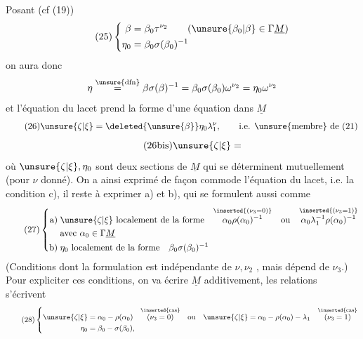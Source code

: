 Posant (cf (19))
\[
\tag{25}
\left\{\begin{aligned}
\beta&=\beta_0\tau^{\nu_2}\qquad(\unsure{\beta_0|\beta}\in\Gamma\underline M)\\
\eta_0&=\beta_0\sigma(\beta_0)^{-1}
\end{aligned}\right.
\]
on aura donc
\[
\eta\overset{\unsure{\mathrm{dfn}}}{=}
\beta\sigma(\beta)^{-1}
=\beta_0\sigma(\beta_0)\omega^{\nu_2}
=\eta_0\omega^{\nu_2}
\]
et l'équation du lacet prend la forme
d'une équation dans $\underline M$
\[
\tag{26}
\unsure{\zeta|\xi}=\deleted{\unsure{\beta}}\eta_0\lambda_1^\nu,
\qquad\text{i.e. \unsure{membre} de (21)}
\]
\[
\tag{26bis}\unsure{\zeta|\xi}=
\]
où $\unsure{\zeta|\xi},\eta_0$ sont deux sections de $\underline M$ qui
se déterminent mutuellement (pour $\nu$
donné). On a ainsi exprimé de façon
commode l'équation du lacet, i.e. la
condition c), il reste à exprimer a) et b),
qui se formulent aussi comme
\[
\tag{27}
\left\{\begin{aligned}
\text{a)}\;&\unsure{\zeta|\xi}\ \text{localement de la forme}\quad
\overset{\inserted{(\nu_3=0)}}{\alpha_0\rho(\alpha_0)^{-1}}
\quad\text{ou}\quad
\overset{\inserted{(\nu_3=1)}}{\alpha_0\lambda_1^{-1}\rho(\alpha_0)^{-1}}\\
&\text{avec }\alpha_0\in\Gamma\underline M\\
\text{b)}\;&\eta_0\ \text{localement de la forme}\quad\beta_0\sigma(\beta_0)^{-1}
\end{aligned}\right.
\]
(Conditions dont la formulation est indépendante
de $\nu,\nu_2$ , mais dépend  de
$\nu_3$.) Pour expliciter ces conditions, on
va écrire $\underline M$ additivement, les relations
s'écrivent
\[
\tag{28}
\left\{\begin{aligned}
\unsure{\zeta|\xi}&=\alpha_0-\rho(\alpha_0)
\quad\overset{\inserted{\text{cas}}}{(\nu_3=0)}
\quad\text{ou}\quad
\unsure{\zeta|\xi}=\alpha_0-\rho(\alpha_0)-\lambda_1
\quad\overset{\inserted{\text{cas}}}{(\nu_3=1)}\\
\eta_0&=\beta_0-\sigma(\beta_0),
\end{aligned}\right.
\]

